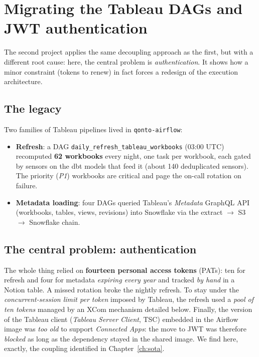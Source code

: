 \chapter{Migrating the Tableau DAGs and JWT authentication}\label{ch:tableau}

The second project applies the same decoupling approach as the first, but with a different root cause: here, the central problem is \emph{authentication}. It shows how a minor constraint (tokens to renew) in fact forces a redesign of the execution architecture.

\section{The legacy}

Two families of Tableau pipelines lived in \texttt{qonto-airflow}:

\begin{itemize}
  \item \textbf{Refresh}: a DAG \texttt{daily\_refresh\_tableau\_workbooks} (03:00 UTC) recomputed \textbf{62 workbooks} every night, one task per workbook, each gated by sensors on the dbt models that feed it (about 140 deduplicated sensors). The priority (\emph{P1}) workbooks are critical and page the on-call rotation on failure.
  \item \textbf{Metadata loading}: four DAGs queried Tableau's \emph{Metadata} GraphQL API (workbooks, tables, views, revisions) into Snowflake via the extract $\rightarrow$ S3 $\rightarrow$ Snowflake chain.
\end{itemize}

\section{The central problem: authentication}

The whole thing relied on \textbf{fourteen personal access tokens} (PATs): ten for refresh and four for metadata \emph{expiring every year} and tracked \emph{by hand} in a Notion table. A missed rotation broke the nightly refresh. To stay under the \emph{concurrent-session limit per token} imposed by Tableau, the refresh used a \emph{pool of ten tokens} managed by an XCom mechanism detailed below. Finally, the version of the Tableau client (\emph{Tableau Server Client}, TSC) embedded in the Airflow image was \emph{too old} to support \emph{Connected Apps}: the move to JWT was therefore \emph{blocked} as long as the dependency stayed in the shared image. We find here, exactly, the coupling identified in Chapter~\ref{ch:sota}.

